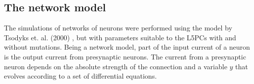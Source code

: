 \subsection*{The network model}
The simulations of networks of neurons were performed using the model by Tsodyks et. al. (2000) \cite{tsodyks2000synchrony}, but with parameters suitable to the L5PCs with and without mutations. Being a network model, part of the input current of a neuron is the output current from presynaptic neurons.
The current from a presynaptic neuron depends on the absolute strength of the connection and a variable $y$ that evolves according to a set of differential equations.
